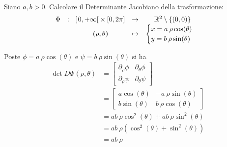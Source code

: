 \begin{exercise}
	Siano $a,b > 0$. Calcolare il Determinante Jacobiano della trasformazione:
	\[
		\begin{array}{ccccc} {
			\Phi
		} & : & {
			\left]0,+ \infty\right[ \times \left[0,2 \pi\right]
		} & \to & {
			\mathbb{R}^2 \setminus \left\{(0,0)\right\}
		} \\ & & {
			(\rho, \theta)
		} & \mapsto & {
			\begin{cases}
				x = a \:\rho \cos(\theta)\\
				y = b \:\rho \sin(\theta)
			\end{cases}
		} \\ \end{array}
	\]
	\begin{solution}
		Poste $\phi = a \:\rho \cos(\theta)$ e $\psi = b \:\rho \sin(\theta)$ si ha
		\begin{align*}
			\det D\Phi(\rho, \theta)
			&= \begin{bmatrix}
				\partial_\rho \phi & \partial_\theta \phi\\
				\partial_\rho \psi & \partial_\theta \psi
			\end{bmatrix}\\
			&= \begin{bmatrix}
				a \cos(\theta) & - a \:\rho \sin(\theta)\\
				b \sin(\theta) & b \:\rho \cos(\theta)
			\end{bmatrix}\\
			&= ab \:\rho \cos^2(\theta) + ab \:\rho \sin^2(\theta)\\
			&= ab \:\rho (\cos^2(\theta) + \sin^2(\theta))\\
			&= ab \:\rho
		\end{align*}
	\end{solution}
\end{exercise}
